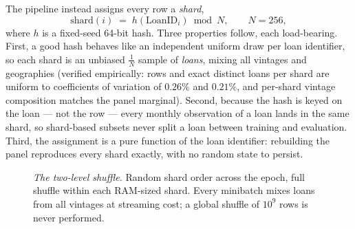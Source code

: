 The pipeline instead assigns every row a \emph{shard},
\begin{equation}
\label{eq:shard}
\mathrm{shard}(i) \;=\; h\!\left(\mathrm{LoanID}_i\right) \bmod N,
\qquad N=256,
\end{equation}
where $h$ is a fixed-seed 64-bit hash.  Three properties follow, each
load-bearing.  First, a good hash behaves like an independent uniform
draw per loan identifier, so each shard is an unbiased $\tfrac1N$
sample of \emph{loans}, mixing all vintages and geographies (verified
empirically: rows and exact distinct loans per shard are uniform to
coefficients of variation of $0.26\%$ and $0.21\%$, and per-shard
vintage composition matches the panel marginal).  Second, because the
hash is keyed on the loan --- not the row --- every monthly
observation of a loan lands in the same shard, so shard-based subsets
never split a loan between training and evaluation.  Third, the
assignment is a pure function of the loan identifier: rebuilding the
panel reproduces every shard exactly, with no random state to
persist.

\begin{figure}[htbp]
\centering
{}
\caption[The two-level shuffle over loan-keyed shards]{\textit{The
two-level shuffle.}  Random shard order across the epoch, full
shuffle within each RAM-sized shard.  Every minibatch mixes loans
from all vintages at streaming cost; a global shuffle of $10^9$ rows
is never performed.}
\label{fig:shardloop}
\end{figure}

